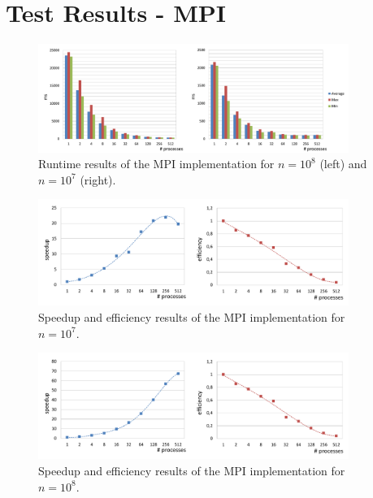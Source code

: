 \documentclass[12pt,a4paper]{article}
\begin{document}
\section{Test Results - MPI}
\begin{figure}[h]
	\includegraphics[width=0.9\textwidth]{img/mpi_results.pdf}
	\caption{Runtime results of the MPI implementation for $n=10^{8}$ (left) and $n=10^{7}$ (right).}
\end{figure}
\begin{figure}[h]
	\includegraphics[width=0.9\textwidth]{img/mpi_results_sp_eff10.pdf}
	\caption{Speedup and efficiency results of the MPI implementation for $n=10^{7}$.}
\end{figure}
\begin{figure}[h]
	\includegraphics[width=0.9\textwidth]{img/mpi_results_sp_eff100.pdf}
	\caption{Speedup and efficiency results of the MPI implementation for $n=10^{8}$.}
\end{figure}
\end{document}
